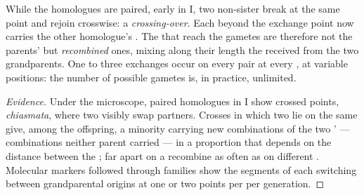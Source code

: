 \begin{proposition}\label{prop:g12:meiosis-genetic-shuffling:crossingover}
While the homologues are paired, early in  I, two non-sister
 break at the same point and rejoin crosswise: a
\emph{crossing-over}. Each  beyond the
exchange point now carries the other homologue's . The
 that reach the gametes are therefore not the parents'
 but \emph{recombined} ones, mixing along their length the
 received from the two grandparents. One to three exchanges
occur on every pair at every , at variable positions: the
number of possible gametes is, in practice, unlimited.
\end{proposition}
\begin{proof}[Evidence]
Under the microscope, paired homologues in  I show crossed
points, \emph{chiasmata}, where two  visibly swap partners.
Crosses in which two  lie on the same  give, among the
offspring, a minority carrying new combinations of the two '
 --- combinations neither parent carried --- in a proportion
that depends on the distance between the ;  far apart on a
 recombine as often as  on different .
Molecular markers followed through families show the segments of each
 switching between grandparental origins at one or two
points per  per generation.
\end{proof}

